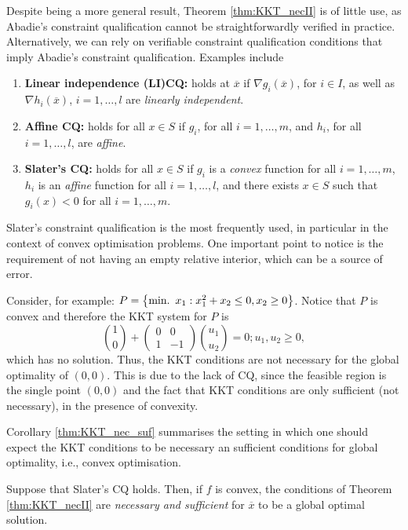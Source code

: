 Despite being a more general result, Theorem \ref{thm:KKT_necII} is of little use, as Abadie's  constraint qualification cannot be straightforwardly verified in practice. Alternatively, we can rely on verifiable constraint qualification conditions that imply Abadie's constraint qualification. Examples include 
%
\begin{enumerate}
\item {\bf Linear independence (LI)CQ:} holds at $\overline{x}$ if $\nabla g_i(\overline{x})$, for $i \in I$, as well as $\nabla h_i(\overline{x})$, $i = 1,\dots, l$ are \emph{linearly independent}.
\item {\bf Affine CQ:} holds for all $x \in S$ if $g_i$, for all $i=1,\dots,m$, and $h_i$, for all $i = 1,\dots, l$, are \emph{affine}.
\item {\bf Slater's CQ:} holds for all $x \in S$ if $g_i$ is a \emph{convex} function for all $i = 1,\dots,m$, $h_i$ is an \emph{affine} function for all $i = 1,\dots, l$, and there exists $x \in S$ such that $g_i(x) < 0$ for all $i = 1,\dots, m$.
\end{enumerate}
%
Slater's constraint qualification is the most frequently used, in particular in the context of convex optimisation problems. One important point to notice is the requirement of not having an empty relative interior, which can be a source of error. 

Consider, for example: $P = \left\{ \mathop{\text{min.~}} x_1 : x_1^2 + x_2 \leq 0, x_2 \geq 0 \right \}$. Notice that $P$ is convex and therefore the KKT system for $P$ is 
$$ \binom{1}{0} + \begin{pmatrix} 0 & 0 \\ 1 & -1\end{pmatrix}\binom{u_1}{u_2} = 0; u_1,u_2 \geq 0,$$
which has no solution. Thus, the KKT conditions are not necessary for the global optimality of $(0,0)$. This is due to the lack of CQ, since the feasible region is the single point $(0,0)$ and the fact that KKT conditions are only sufficient (not necessary), in the presence of convexity.

Corollary \ref{thm:KKT_nec_suf} summarises the setting in which one should expect the KKT conditions to be necessary an sufficient conditions for global optimality, i.e., convex optimisation.

\begin{corollary} \label{thm:KKT_nec_suf}
Suppose that Slater's CQ holds. Then, if $f$ is convex, the conditions of Theorem \ref{thm:KKT_necII} are \emph{necessary and sufficient} for $\overline{x}$ to be a global optimal solution. 
\end{corollary}
